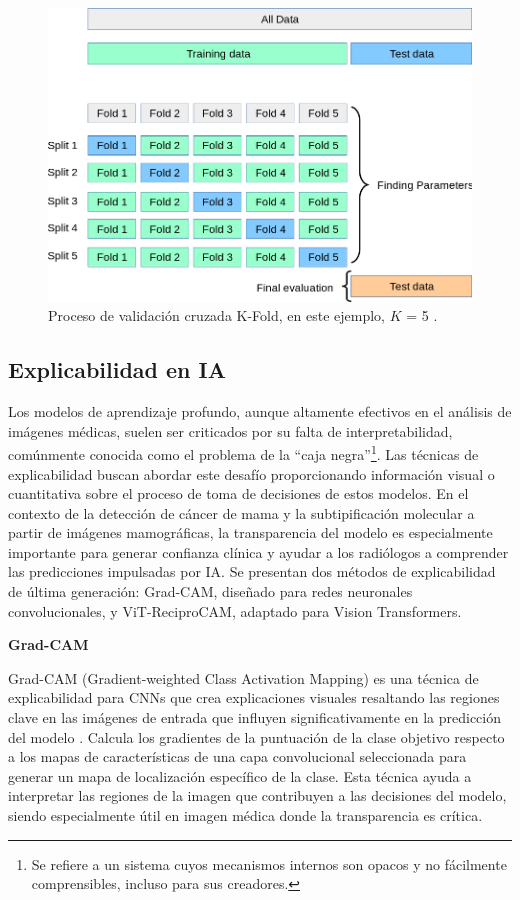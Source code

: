 \documentclass[a4paper,10pt]{book}
\begin{document}
\begin{figure}[h!]
\centering
\includegraphics[width=0.75\linewidth]{reports//assets/k-fold.png}
\caption[K-Fold Cross Validation]{Proceso de validación cruzada K-Fold, en este ejemplo, $K$ = 5 \cite{noauthor_31_nodate}.}
\label{fig:k_fold}
\end{figure}

\subsection{Explicabilidad en IA}

Los modelos de aprendizaje profundo, aunque altamente efectivos en el análisis de imágenes médicas, suelen ser criticados por su falta de interpretabilidad, comúnmente conocida como el problema de la “caja negra”\footnote{Se refiere a un sistema cuyos mecanismos internos son opacos y no fácilmente comprensibles, incluso para sus creadores.}. Las técnicas de explicabilidad buscan abordar este desafío proporcionando información visual o cuantitativa sobre el proceso de toma de decisiones de estos modelos. En el contexto de la detección de cáncer de mama y la subtipificación molecular a partir de imágenes mamográficas, la transparencia del modelo es especialmente importante para generar confianza clínica y ayudar a los radiólogos a comprender las predicciones impulsadas por IA. Se presentan dos métodos de explicabilidad de última generación: Grad-CAM, diseñado para redes neuronales convolucionales, y ViT-ReciproCAM, adaptado para Vision Transformers.

\textbf{Grad-CAM}

Grad-CAM (Gradient-weighted Class Activation Mapping) es una técnica de explicabilidad para CNNs que crea explicaciones visuales resaltando las regiones clave en las imágenes de entrada que influyen significativamente en la predicción del modelo \cite{noauthor_161002391_nodate}. Calcula los gradientes de la puntuación de la clase objetivo respecto a los mapas de características de una capa convolucional seleccionada para generar un mapa de localización específico de la clase. Esta técnica ayuda a interpretar las regiones de la imagen que contribuyen a las decisiones del modelo, siendo especialmente útil en imagen médica donde la transparencia es crítica.
\end{document}
